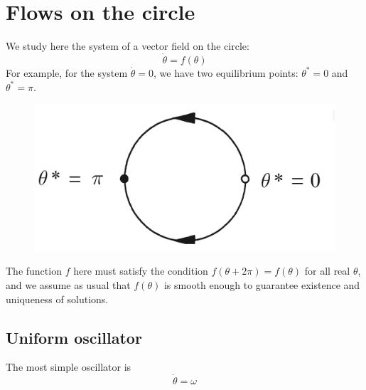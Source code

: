 \documentclass[12pt, openany]{report}
\theoremstyle{definition}
\begin{document}
\chapter{Flows on the circle}
We study here the system of a vector field on the circle:
\begin{equation}\label{eq:polar}
    \dot \theta = f(\theta)
\end{equation}
For example, for the system $\dot \theta = 0$, we have two equilibrium points: $\theta^*=0$ and $\theta^*=\pi$. 
\begin{figure}[H]
    \centering
    \includegraphics[width=.2\textwidth]{img/theta0.png}
\end{figure}
The function $f$ here must satisfy the condition $f(\theta+2\pi)=f(\theta)$ for all real $\theta$, and we assume as usual that $f(\theta)$ is smooth enough to guarantee existence and uniqueness of solutions. 
\section{Uniform oscillator}   
The most simple oscillator is 
\begin{equation}
    \dot \theta = \omega
\end{equation}
\end{document}
